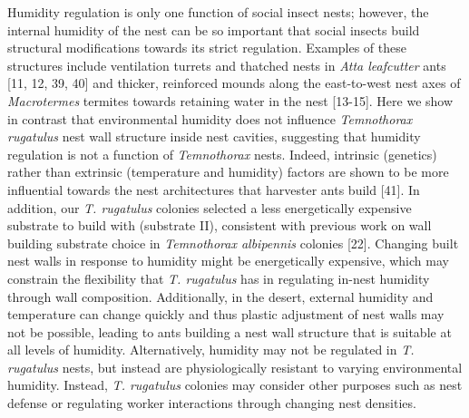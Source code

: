 \documentclass[3p]{elsarticle} %
\begin{document}
Humidity regulation is only one function of social insect nests;
however, the internal humidity of the nest can be so important that
social insects build structural modifications towards its strict
regulation. Examples of these structures include ventilation turrets and
thatched nests in \emph{Atta leafcutter} ants {[}11, 12, 39, 40{]} and
thicker, reinforced mounds along the east-to-west nest axes of
\emph{Macrotermes} termites towards retaining water in the nest
{[}13-15{]}. Here we show in contrast that environmental humidity does
not influence \emph{Temnothorax rugatulus} nest wall structure inside
nest cavities, suggesting that humidity regulation is not a function of
\emph{Temnothorax} nests. Indeed, intrinsic (genetics) rather than
extrinsic (temperature and humidity) factors are shown to be more
influential towards the nest architectures that harvester ants build
{[}41{]}. In addition, our \emph{T. rugatulus} colonies selected a less
energetically expensive substrate to build with (substrate II),
consistent with previous work on wall building substrate choice in
\emph{Temnothorax albipennis} colonies {[}22{]}. Changing built nest
walls in response to humidity might be energetically expensive, which
may constrain the flexibility that \emph{T. rugatulus} has in regulating
in-nest humidity through wall composition. Additionally, in the desert,
external humidity and temperature can change quickly and thus plastic
adjustment of nest walls may not be possible, leading to ants building a
nest wall structure that is suitable at all levels of humidity.
Alternatively, humidity may not be regulated in \emph{T. rugatulus}
nests, but instead are physiologically resistant to varying
environmental humidity. Instead, \emph{T. rugatulus} colonies may
consider other purposes such as nest defense or regulating worker
interactions through changing nest densities.
\end{document}
